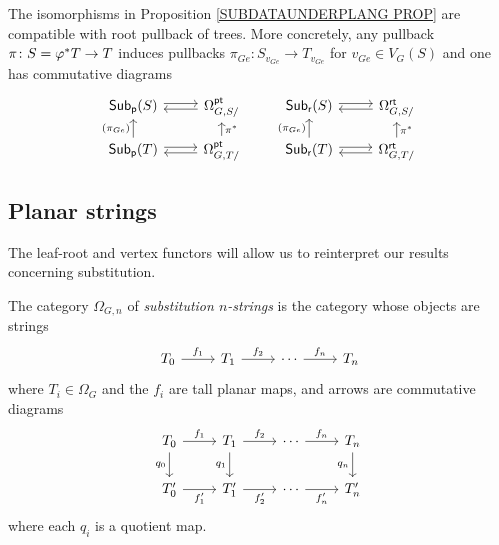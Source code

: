 \documentclass[a4paper,10pt]{article}%
\begin{document}
\begin{remark}\label{PULLCOMP REM}
	The isomorphisms in Proposition \ref{SUBDATAUNDERPLANG PROP}
	are compatible with root pullback of trees. More concretely, any pullback $\pi \colon S=\varphi^{\**} T \to T$ induces pullbacks 
	$\pi_{Ge}\colon S_{v_{Ge}} \to T_{v_{Ge}}$ for $v_{Ge} \in V_G(S)$ and one has commutative diagrams
\begin{equation}\label{SUBDATAUNDERPLANG2 EQ}
\begin{tikzcd}[row sep =10pt]
	\mathsf{Sub}_{\mathsf{p}}(S) \ar[r,shift left=2pt] &
	\Omega_{G,S/}^{\mathsf{pt}} \ar[l,shift left=2pt] &
	\mathsf{Sub}_{\mathsf{r}}(S) \ar[r,shift left=2pt] &
	\Omega_{G,S/}^{\mathsf{rt}} \ar[l,shift left=2pt]
\\
	\mathsf{Sub}_{\mathsf{p}}(T) \ar[r,shift left=2pt] \ar{u}{(\pi_{Ge})} &
	\Omega_{G,T/}^{\mathsf{pt}} \ar[l,shift left=2pt] \ar{u}[swap]{\pi^{\**}} &
	\mathsf{Sub}_{\mathsf{r}}(T) \ar[r,shift left=2pt] \ar{u}{(\pi_{Ge})} &
	\Omega_{G,T/}^{\mathsf{rt}} \ar[l,shift left=2pt] \ar{u}[swap]{\pi^{\**}}
\end{tikzcd}
\end{equation}
\end{remark}



\subsection{Planar strings}\label{PLANARSTRING SEC}

The leaf-root and vertex functors will allow us to reinterpret our results concerning substitution.

\begin{definition}
	The category $\Omega_{G,n}$ of 
	\textit{substitution $n$-strings} is the category whose objects are strings
	\[
	\begin{tikzcd}
	T_0 \ar{r}{f_1} & T_1 \ar{r}{f_2} & \cdots \ar{r}{f_n} & T_n
	\end{tikzcd}	
	\]
	where $T_i \in \Omega_G$ and the $f_i$ are tall planar maps, and arrows are commutative diagrams 
	\begin{equation} \label{PTNARROW EQ}
	\begin{tikzcd}
	T_0 \ar{r}{f_1} \ar{d}[swap]{q_0} & T_1 \ar{r}{f_2} \ar{d}[swap]{q_1} & \cdots \ar{r}{f_n} & T_n \ar{d}[swap]{q_n}
\\
	T'_0 \ar{r}[swap]{f'_1} & T'_1 \ar{r}[swap]{f'_2} & \cdots \ar{r}[swap]{f'_n} & T'_n
	\end{tikzcd}	
	\end{equation}
where each $q_i$ is a quotient map.
\end{definition}
\end{document}

